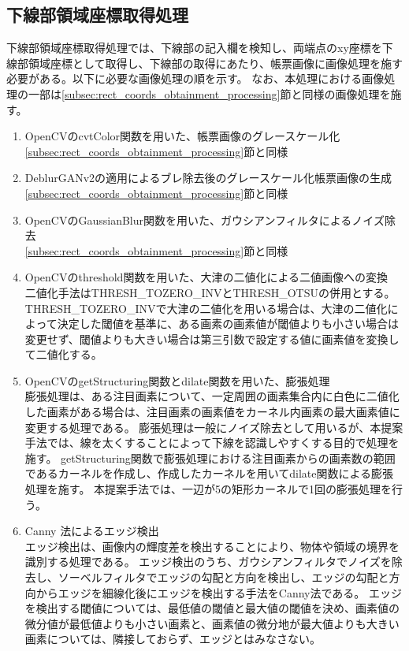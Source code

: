 \subsection{下線部領域座標取得処理}\label{subsec:underline_coords_obtainment_processing}
下線部領域座標取得処理では、下線部の記入欄を検知し、両端点のxy座標を下線部領域座標として取得し、下線部の取得にあたり、帳票画像に画像処理を施す必要がある。以下に必要な画像処理の順を示す。
なお、本処理における画像処理の一部は\ref{subsec:rect_coords_obtainment_processing}節と同様の画像処理を施す。

\begin{enumerate}
    \item OpenCVのcvtColor関数を用いた、帳票画像のグレースケール化\\
        \ref{subsec:rect_coords_obtainment_processing}節と同様
    \item DeblurGANv2の適用によるブレ除去後のグレースケール化帳票画像の生成\\
        \ref{subsec:rect_coords_obtainment_processing}節と同様
    \item OpenCVのGaussianBlur関数を用いた、ガウシアンフィルタによるノイズ除去\\
        \ref{subsec:rect_coords_obtainment_processing}節と同様
    \item OpenCVのthreshold関数を用いた、大津の二値化による二値画像への変換\\
        二値化手法はTHRESH\_TOZERO\_INVとTHRESH\_OTSUの併用とする。
        THRESH\_TOZERO\_INVで大津の二値化を用いる場合は、大津の二値化によって決定した閾値を基準に、ある画素の画素値が閾値よりも小さい場合は変更せず、閾値よりも大きい場合は第三引数で設定する値に画素値を変換して二値化する。
    \item OpenCVのgetStructuring関数とdilate関数を用いた、膨張処理\\
        膨張処理は、ある注目画素について、一定周囲の画素集合内に白色に二値化した画素がある場合は、注目画素の画素値をカーネル内画素の最大画素値に変更する処理である\cite{膨張処理}。
        膨張処理は一般にノイズ除去として用いるが、本提案手法では、線を太くすることによって下線を認識しやすくする目的で処理を施す。
        getStructuring関数で膨張処理における注目画素からの画素数の範囲であるカーネルを作成し、作成したカーネルを用いてdilate関数による膨張処理を施す。
        本提案手法では、一辺が5の矩形カーネルで1回の膨張処理を行う。
    \item Canny 法によるエッジ検出\\
        エッジ検出は、画像内の輝度差を検出することにより、物体や領域の境界を識別する処理である\cite{エッジ検出}。
        エッジ検出のうち、ガウシアンフィルタでノイズを除去し、ソーベルフィルタでエッジの勾配と方向を検出し、エッジの勾配と方向からエッジを細線化後にエッジを検出する手法をCanny法である。
        エッジを検出する閾値については、最低値の閾値と最大値の閾値を決め、画素値の微分値が最低値よりも小さい画素と、画素値の微分地が最大値よりも大きい画素については、隣接しておらず、エッジとはみなさない。


\end{enumerate}

